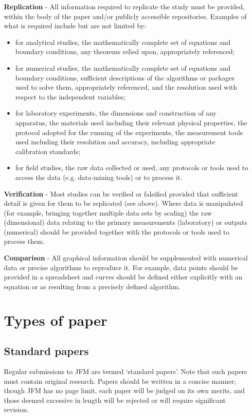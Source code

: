 \documentclass[lineno]{jfm}
\begin{document}
 {\bf Replication} - All information required to replicate the study must be provided, within the body of the paper and/or publicly accessible repositories.  Examples of what is required include but are not limited by:
\begin{itemize}
\item for analytical studies, the mathematically complete set of equations and boundary conditions, any theorems relied upon, appropriately referenced;
\item for numerical studies, the mathematically complete set of equations and boundary conditions, sufficient descriptions of the algorithms or packages used to solve them, appropriately referenced, and the resolution used with respect to the independent variables;
\item for laboratory experiments, the dimensions and construction of any apparatus, the materials used including their relevant physical properties, the protocol adopted for the running of the experiments, the measurement tools used including their resolution and accuracy, including appropriate calibration standards;
\item for field studies, the raw data collected or used, any protocols or tools used to access the data (e.g. data-mining tools) or to process it.
\end{itemize}
{\bf Verification} -  Most studies can be verified or falsified provided that sufficient detail is given for them to be replicated (see above).  Where data is manipulated (for example, bringing together multiple data sets by scaling) the raw (dimensional) data relating to the primary measurements (laboratory) or outputs (numerical) should be provided together with the protocols or tools used to process them.

{\bf Comparison} - All graphical information should be supplemented with numerical data or precise algorithms to reproduce it.  For example, data points should be provided in a spreadsheet and curves should be defined either explicitly with an equation or as resulting from a precisely defined algorithm.


\section{Types of paper}\label{sec:types_paper}
\subsection{Standard papers}
 Regular submissions to JFM are termed `standard papers'. Note that such papers must contain original research. Papers should be written in a concise manner; though JFM has no page limit, each paper will be judged on its own merits, and those deemed excessive in length will be rejected or will require significant revision.
\end{document}
